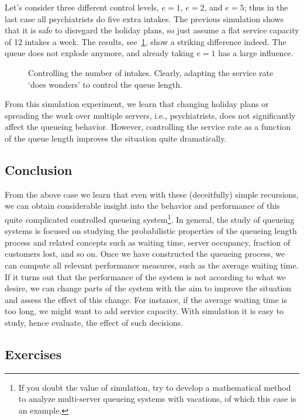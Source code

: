 Let's consider three different control levels, $e=1$, $e=2$, and $e=5$; thus in the last case all psychiatrists do five extra intakes.
The previous simulation shows that it is safe to disregard the holiday plans, so just assume a flat service capacity of 12 intakes a week.
The results, see~\cref{fig:intakes}, show a striking difference indeed.
The queue does not explode anymore, and already taking $e=1$ has a large influence.


\begin{figure}[ht]
 \centering
 
\caption{Controlling the number of intakes. Clearly, adapting the
 service rate `does wonders' to control the queue length.}
\label{fig:intakes}
\end{figure}


From this simulation experiment, we learn that changing holiday plans or spreading the work over multiple servers, i.e., psychiatrists, does not significantly affect the queueing behavior.
However, controlling the service rate as a function of the queue length improves the situation quite dramatically.


\subsection*{Conclusion}
\label{sec:conclusion}

From the above case we learn that even with these (deceitfully) simple recursions, we can obtain considerable insight into the behavior and performance of this quite complicated controlled queueing system\footnote{If you doubt the value of simulation, try to develop a mathematical method to analyze multi-server queueing systems with vacations, of which this case is an example.}.
In general, the study of queueing systems is focused on studying the probabilistic properties of the queueing length process and related concepts such as waiting time, server occupancy, fraction of customers lost, and so on.
Once we have constructed the queueing process, we can compute all relevant performance measures, such as the average waiting time.
If it turns out that the performance of the system is not according to what we desire, we can change parts of the system with the aim to improve the situation and assess the effect of this change.
For instance, if the average waiting time is too long, we might want to add service capacity.
With simulation it is easy to study, hence evaluate, the effect of such decisions.

\subsection*{Exercises}
\label{sec:exercises-1}


